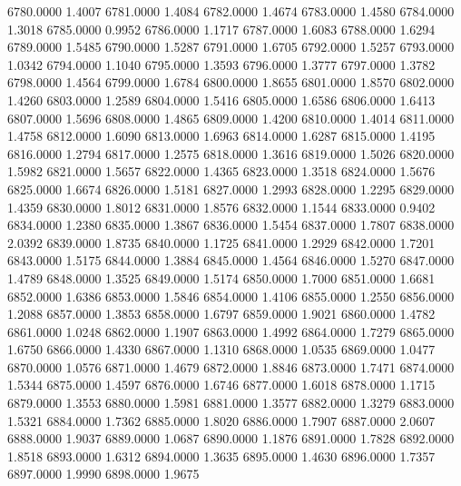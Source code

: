 6780.0000      1.4007
6781.0000      1.4084
6782.0000      1.4674
6783.0000      1.4580
6784.0000      1.3018
6785.0000      0.9952
6786.0000      1.1717
6787.0000      1.6083
6788.0000      1.6294
6789.0000      1.5485
6790.0000      1.5287
6791.0000      1.6705
6792.0000      1.5257
6793.0000      1.0342
6794.0000      1.1040
6795.0000      1.3593
6796.0000      1.3777
6797.0000      1.3782
6798.0000      1.4564
6799.0000      1.6784
6800.0000      1.8655
6801.0000      1.8570
6802.0000      1.4260
6803.0000      1.2589
6804.0000      1.5416
6805.0000      1.6586
6806.0000      1.6413
6807.0000      1.5696
6808.0000      1.4865
6809.0000      1.4200
6810.0000      1.4014
6811.0000      1.4758
6812.0000      1.6090
6813.0000      1.6963
6814.0000      1.6287
6815.0000      1.4195
6816.0000      1.2794
6817.0000      1.2575
6818.0000      1.3616
6819.0000      1.5026
6820.0000      1.5982
6821.0000      1.5657
6822.0000      1.4365
6823.0000      1.3518
6824.0000      1.5676
6825.0000      1.6674
6826.0000      1.5181
6827.0000      1.2993
6828.0000      1.2295
6829.0000      1.4359
6830.0000      1.8012
6831.0000      1.8576
6832.0000      1.1544
6833.0000      0.9402
6834.0000      1.2380
6835.0000      1.3867
6836.0000      1.5454
6837.0000      1.7807
6838.0000      2.0392
6839.0000      1.8735
6840.0000      1.1725
6841.0000      1.2929
6842.0000      1.7201
6843.0000      1.5175
6844.0000      1.3884
6845.0000      1.4564
6846.0000      1.5270
6847.0000      1.4789
6848.0000      1.3525
6849.0000      1.5174
6850.0000      1.7000
6851.0000      1.6681
6852.0000      1.6386
6853.0000      1.5846
6854.0000      1.4106
6855.0000      1.2550
6856.0000      1.2088
6857.0000      1.3853
6858.0000      1.6797
6859.0000      1.9021
6860.0000      1.4782
6861.0000      1.0248
6862.0000      1.1907
6863.0000      1.4992
6864.0000      1.7279
6865.0000      1.6750
6866.0000      1.4330
6867.0000      1.1310
6868.0000      1.0535
6869.0000      1.0477
6870.0000      1.0576
6871.0000      1.4679
6872.0000      1.8846
6873.0000      1.7471
6874.0000      1.5344
6875.0000      1.4597
6876.0000      1.6746
6877.0000      1.6018
6878.0000      1.1715
6879.0000      1.3553
6880.0000      1.5981
6881.0000      1.3577
6882.0000      1.3279
6883.0000      1.5321
6884.0000      1.7362
6885.0000      1.8020
6886.0000      1.7907
6887.0000      2.0607
6888.0000      1.9037
6889.0000      1.0687
6890.0000      1.1876
6891.0000      1.7828
6892.0000      1.8518
6893.0000      1.6312
6894.0000      1.3635
6895.0000      1.4630
6896.0000      1.7357
6897.0000      1.9990
6898.0000      1.9675
